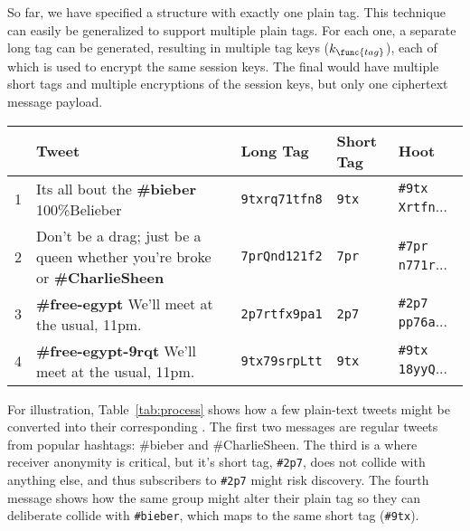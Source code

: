 So far, we have specified a \msg structure with exactly one plain tag.
This technique can easily be generalized to support multiple plain tags. For
each one, a separate long tag can be generated, resulting in multiple
tag keys ($k_{\func{tag}}$), each of which is used to encrypt the same
session keys. The final \hoot would have multiple short tags and multiple
encryptions of the session keys, but only one ciphertext message
payload.

\begin{table*}
\caption{This table shows how several tweets might be converted to
  \msgs, showing the long tag, the short tag, and the final \msg. The
  fourth message in this list demonstrates how a group could take
  advantage of the \hoot system to collide its \msgs with those of an
  unrelated tag used for non-controversial messages.
\label{tab:process}
}
\begin{center}
    \begin{tabular}{ l  l  l  l  l }
	 & Tweet & Long Tag & Short Tag & Hoot \\ \hline
	1 & Its all bout the {\bf \#bieber} 100\%Belieber                                 & {\tt 9txrq71tfn8} &  {\tt 9tx} & {\tt \#9tx Xrtfn}... \\
	2 & Don't be a drag; just be a queen whether you're broke or {\bf \#CharlieSheen} & {\tt 7prQnd121f2} & {\tt 7pr} & {\tt \#7pr n771r}... \\
	3 & {\bf \#free-egypt} We'll meet at the usual, 11pm.                             & {\tt 2p7rtfx9pa1} & {\tt 2p7} & {\tt \#2p7 pp76a}... \\
	4 & {\bf \#free-egypt-9rqt} We'll meet at the usual, 11pm.                        & {\tt 9tx79srpLtt} &  {\tt 9tx}  & {\tt \#9tx 18yyQ}... \\
    \end{tabular}
\end{center}
\end{table*}

For illustration, Table~\ref{tab:process} shows how a few plain-text
tweets might be converted into their corresponding \msgs. The first two
messages are regular tweets from popular hashtags: \#bieber and
\#CharlieSheen. The third is a \msg where receiver anonymity is
critical, but it's short tag, {\tt \#2p7}, does not collide with
anything else, and thus subscribers to {\tt \#2p7} might risk
discovery. The fourth message shows how the same group might alter their
plain tag so they can deliberate collide with {\tt \#bieber}, which maps
to the same short tag ({\tt \#9tx}).


